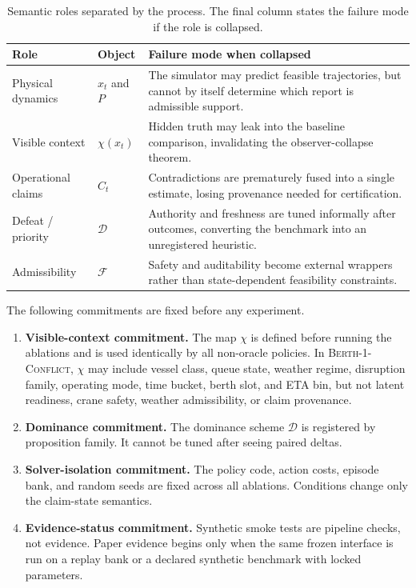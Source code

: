 \documentclass[11pt]{article}
\newcommand{\1}{\mathbf{1}}
\theoremstyle{definition}
\theoremstyle{plain}
\theoremstyle{remark}
\begin{document}
\begin{table}[H]
\centering
\caption{Semantic roles separated by the process. The final column states the failure mode if the role is collapsed.}
\label{tab:semantic-roles}
\small
\begin{tabularx}{\textwidth}{@{}L{0.18\textwidth}L{0.23\textwidth}Y@{}}
\toprule
Role & Object & Failure mode when collapsed \\
\midrule
Physical dynamics & $x_t$ and $P$ & The simulator may predict feasible trajectories, but cannot by itself determine which report is admissible support. \\
Visible context & $\chi(x_t)$ & Hidden truth may leak into the baseline comparison, invalidating the observer-collapse theorem. \\
Operational claims & $C_t$ & Contradictions are prematurely fused into a single estimate, losing provenance needed for certification. \\
Defeat / priority & $\mathcal D$ & Authority and freshness are tuned informally after outcomes, converting the benchmark into an unregistered heuristic. \\
Admissibility & $\mathcal F$ & Safety and auditability become external wrappers rather than state-dependent feasibility constraints. \\
\bottomrule
\end{tabularx}
\end{table}

The following commitments are fixed before any experiment.

\begin{enumerate}[leftmargin=1.6em]
  \item \textbf{Visible-context commitment.} The map $\chi$ is defined before running the ablations and is used identically by all non-oracle policies. In \textsc{Berth-1-Conflict}, $\chi$ may include vessel class, queue state, weather regime, disruption family, operating mode, time bucket, berth slot, and ETA bin, but not latent readiness, crane safety, weather admissibility, or claim provenance.
  \item \textbf{Dominance commitment.} The dominance scheme $\mathcal D$ is registered by proposition family. It cannot be tuned after seeing paired deltas.
  \item \textbf{Solver-isolation commitment.} The policy code, action costs, episode bank, and random seeds are fixed across all ablations. Conditions change only the claim-state semantics.
  \item \textbf{Evidence-status commitment.} Synthetic smoke tests are pipeline checks, not evidence. Paper evidence begins only when the same frozen interface is run on a replay bank or a declared synthetic benchmark with locked parameters.
\end{enumerate}
\end{document}
